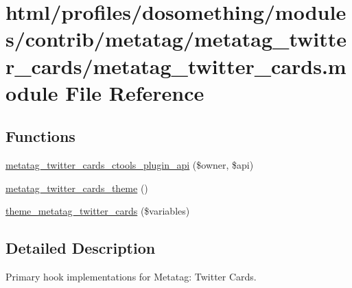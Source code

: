 \hypertarget{metatag__twitter__cards_8module}{
\section{html/profiles/dosomething/modules/contrib/metatag/metatag\_\-twitter\_\-cards/metatag\_\-twitter\_\-cards.module File Reference}
\label{metatag__twitter__cards_8module}
}
\subsection*{Functions}
\begin{DoxyCompactItemize}
\item 
\hyperlink{metatag__twitter__cards_8module_a7158db59553ff4abfdbcf83478ace619}{metatag\_\-twitter\_\-cards\_\-ctools\_\-plugin\_\-api} (\$owner, \$api)
\item 
\hyperlink{metatag__twitter__cards_8module_a1eea50e7fc5c7ae1f6259584cac894e4}{metatag\_\-twitter\_\-cards\_\-theme} ()
\item 
\hyperlink{metatag__twitter__cards_8module_ad0f849507b32122cc2c99b8f8db23338}{theme\_\-metatag\_\-twitter\_\-cards} (\$variables)
\end{DoxyCompactItemize}


\subsection{Detailed Description}
Primary hook implementations for Metatag: Twitter Cards. 

